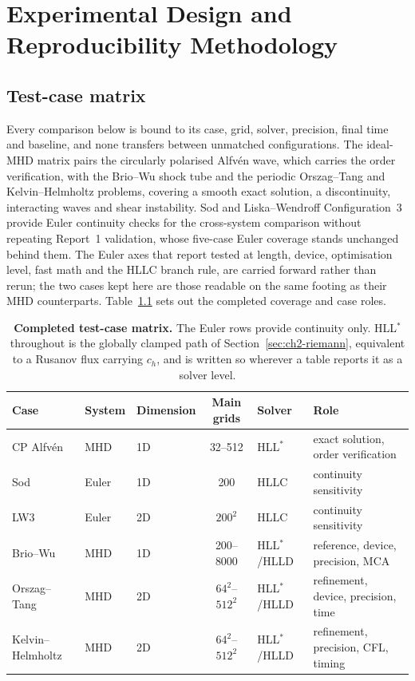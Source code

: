 
\chapter{Experimental Design and Reproducibility Methodology}
\label{chap:methodology}

\section{Test-case matrix}

Every comparison below is bound to its case, grid, solver, precision, final time
and baseline, and none transfers between unmatched configurations.
The ideal-MHD matrix pairs the circularly polarised Alfv\'en wave, which
carries the order verification, with the Brio--Wu shock tube and the periodic
Orszag--Tang and Kelvin--Helmholtz problems, covering a smooth exact solution,
a discontinuity, interacting waves and shear instability. Sod
\citep{toro2009} and Liska--Wendroff Configuration~3
\citep{liska_wendroff_2003} provide Euler continuity checks for the
cross-system comparison without repeating Report~1 validation, whose five-case
Euler coverage stands unchanged behind them. The Euler axes that report tested
at length, device, optimisation level, fast math and the HLLC branch rule, are
carried forward rather than rerun; the two cases kept here are those readable on
the same footing as their MHD counterparts.
Table~\ref{tab:ch3-case-matrix} sets out the completed coverage and case roles.

\begin{table}[htbp]
\centering
\small
\begin{tabularx}{\textwidth}{@{}lllclX@{}}
\toprule
Case & System & Dimension & Main grids & Solver & Role \\
\midrule
CP Alfv\'en & MHD & 1D & 32--512 & HLL$^{\ast}$ & exact solution, order verification \\
Sod & Euler & 1D & 200 & HLLC & continuity sensitivity \\
LW3 & Euler & 2D & $200^2$ & HLLC & continuity sensitivity \\
Brio--Wu & MHD & 1D & 200--8000 & HLL$^{\ast}$/HLLD & reference, device, precision, MCA \\
Orszag--Tang & MHD & 2D & $64^2$--$512^2$ & HLL$^{\ast}$/HLLD & refinement, device, precision, time \\
Kelvin--Helmholtz & MHD & 2D & $64^2$--$512^2$ & HLL$^{\ast}$/HLLD & refinement, precision, CFL, timing \\
\bottomrule
\end{tabularx}
\caption[Completed test-case matrix]{\textbf{Completed test-case matrix.}
The Euler rows provide continuity only. HLL$^{\ast}$ throughout is the globally
clamped path of Section~\ref{sec:ch2-riemann}, equivalent to a Rusanov flux
carrying $c_h$, and is written so wherever a table reports it as a solver
level.}
\label{tab:ch3-case-matrix}
\end{table}

